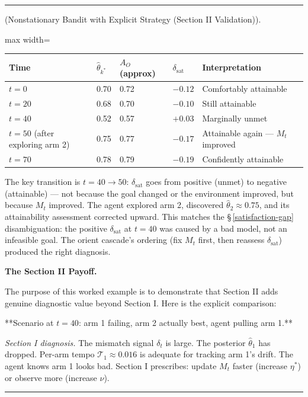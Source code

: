\documentclass[11pt,oneside]{article}
\newcounter{claim}[section]
\renewcommand{\theclaim}{\thesection.\arabic{claim}}
\newenvironment{segment}[2]{%
  \refstepcounter{claim}%
  \bigskip\noindent\hrule\smallskip
  \noindent{\bfseries #1~\theclaim}\enskip(#2).\par\smallskip
  \noindent\ignorespaces
}{%
  \par\smallskip\noindent\hrule\bigskip
}
\newenvironment{remark}[1][]{\begin{segment}{Remark}{#1}}{\end{segment}}
\begin{document}
\begin{remark}[Nonstationary Bandit with Explicit Strategy (Section II Validation)]
\begin{adjustbox}{max width=\textwidth}
\small
\begin{tabular}{lllll}
\toprule
Time & $\hat\theta_{k^*}$ & $A_O$ (approx) & $\delta_\text{sat}$ & Interpretation \\
\midrule
$t = 0$ & 0.70 & 0.72 & $-0.12$ & Comfortably attainable \\
$t = 20$ & 0.68 & 0.70 & $-0.10$ & Still attainable \\
$t = 40$ & 0.52 & 0.57 & $+0.03$ & Marginally unmet \\
$t = 50$ (after exploring arm 2) & 0.75 & 0.77 & $-0.17$ & Attainable again — $M_t$ improved \\
$t = 70$ & 0.78 & 0.79 & $-0.19$ & Confidently attainable \\
\bottomrule
\end{tabular}
\end{adjustbox}


The key transition is $t = 40 \to 50$: $\delta_\text{sat}$ goes from positive (unmet) to negative (attainable) — not because the goal changed or the environment improved, but because $M_t$ improved. The agent explored arm 2, discovered $\hat\theta_2 \approx 0.75$, and its attainability assessment corrected upward. This matches the \S\,\ref{satisfaction-gap} disambiguation: the positive $\delta_\text{sat}$ at $t = 40$ was caused by a bad model, not an infeasible goal. The orient cascade's ordering (fix $M_t$ first, then reassess $\delta_\text{sat}$) produced the right diagnosis.


\medskip\noindent\textbf{The Section II Payoff.}


The purpose of this worked example is to demonstrate that Section II adds genuine diagnostic value beyond Section I. Here is the explicit comparison:

**Scenario at $t = 40$: arm 1 failing, arm 2 actually best, agent pulling arm 1.**

\textit{Section I diagnosis.} The mismatch signal $\delta_t$ is large. The posterior $\hat\theta_1$ has dropped. Per-arm tempo $\mathcal T_1 \approx 0.016$ is adequate for tracking arm 1's drift. The agent knows arm 1 looks bad. Section I prescribes: update $M_t$ faster (increase $\eta^*$) or observe more (increase $\nu$).


\end{remark}
\end{document}
